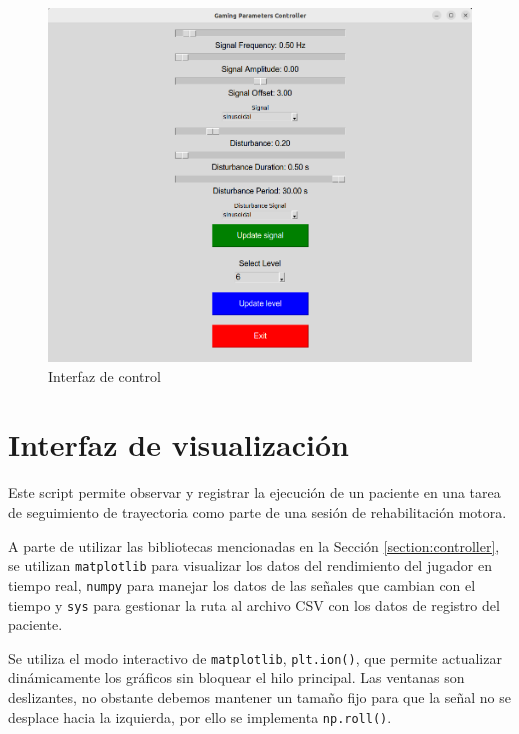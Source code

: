 \begin{figure}[ht!]
	\centering
	\begin{minipage}{0.85\linewidth}
		\centering
		\includegraphics[width=\linewidth]{figs/control_pannel.png}
	\end{minipage}
	\caption[Interfaz de control]{Interfaz de control}
	\label{fig:control}
\end{figure}

\section{Interfaz de visualización}

Este script permite observar y registrar la ejecución de un paciente en una tarea de seguimiento de trayectoria como parte de una sesión de rehabilitación motora.

A parte de utilizar las bibliotecas mencionadas en la Sección \ref{section:controller}, se utilizan \verb|matplotlib| para visualizar los datos del rendimiento del jugador en tiempo real, \verb|numpy| para manejar los datos de las señales que cambian con el tiempo y \verb|sys| para gestionar la ruta al archivo CSV con los datos de registro del paciente.

Se utiliza el modo interactivo de \verb|matplotlib|, \verb|plt.ion()|, que permite actualizar dinámicamente los gráficos sin bloquear el hilo principal.
Las ventanas son deslizantes, no obstante debemos mantener un tamaño fijo para que la señal no se desplace hacia la izquierda, por ello se implementa \verb|np.roll()|.

